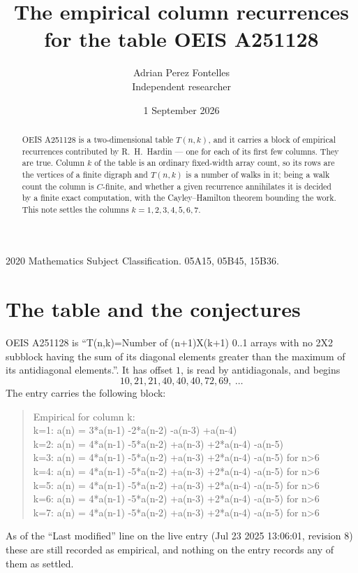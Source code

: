 \documentclass[11pt,a4paper]{article}
\title{The empirical column recurrences for the table OEIS A251128}
\author{Adrian Perez Fontelles\\ \small Independent researcher}
\date{1 September 2026}
\theoremstyle{plain}
\theoremstyle{definition}
\begin{document}
\maketitle

\begin{abstract}
OEIS A251128 is a two-dimensional table $T(n,k)$, and it carries a block of empirical
recurrences contributed by R.~H.~Hardin --- one for each of its first few columns. They are
true. Column $k$ of the table is an ordinary fixed-width array count, so its rows are the
vertices of a finite digraph and $T(n,k)$ is a number of walks in it; being a walk count the
column is $C$-finite, and whether a given recurrence annihilates it is decided by a finite
exact computation, with the Cayley--Hamilton theorem bounding the work. This note settles the
columns $k=1, 2, 3, 4, 5, 6, 7$.
\end{abstract}

\noindent\small 2020 Mathematics Subject Classification. 05A15, 05B45, 15B36.\normalsize

\section{The table and the conjectures}

OEIS A251128 is ``T(n,k)=Number of (n+1)X(k+1) 0..1 arrays with no 2X2 subblock having the sum of its diagonal elements greater than the maximum of its antidiagonal elements.''. It has offset $1$, is
read by antidiagonals, and begins
\[
10, 21, 21, 40, 40, 40, 72, 69,\ \dots
\]
The entry carries the following block:
\begin{quote}\small
Empirical for column k:\\
k=1: a(n) = 3*a(n-1) -2*a(n-2) -a(n-3) +a(n-4)\\
k=2: a(n) = 4*a(n-1) -5*a(n-2) +a(n-3) +2*a(n-4) -a(n-5)\\
k=3: a(n) = 4*a(n-1) -5*a(n-2) +a(n-3) +2*a(n-4) -a(n-5) for n>6\\
k=4: a(n) = 4*a(n-1) -5*a(n-2) +a(n-3) +2*a(n-4) -a(n-5) for n>6\\
k=5: a(n) = 4*a(n-1) -5*a(n-2) +a(n-3) +2*a(n-4) -a(n-5) for n>6\\
k=6: a(n) = 4*a(n-1) -5*a(n-2) +a(n-3) +2*a(n-4) -a(n-5) for n>6\\
k=7: a(n) = 4*a(n-1) -5*a(n-2) +a(n-3) +2*a(n-4) -a(n-5) for n>6\\
\end{quote}
As of the ``Last modified'' line on the live entry (Jul 23 2025 13:06:01, revision 8) these are still
recorded as empirical, and nothing on the entry records any of them as settled.
\end{document}
